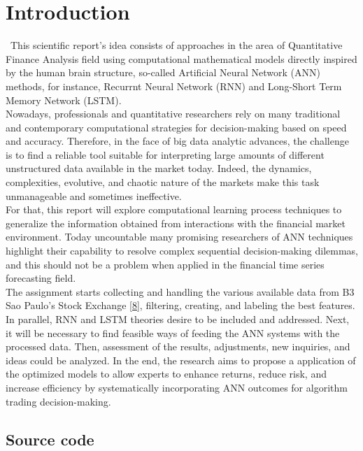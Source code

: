 \section{Introduction}
\label{chap:Introduction}

\quad \, This scientific report's idea consists of approaches in the area of Quantitative Finance Analysis field using computational mathematical models directly inspired by the human brain structure, so-called  Artificial Neural Network (ANN) methods, for instance, Recurrnt Neural Network (RNN) and Long-Short Term Memory Network (LSTM).\\

Nowadays, professionals and quantitative researchers rely on many traditional and contemporary computational strategies for decision-making based on speed and accuracy. Therefore, in the face of big data analytic advances, the challenge is to find a reliable tool suitable for interpreting large amounts of different unstructured data available in the market today. Indeed, the dynamics, complexities, evolutive, and chaotic nature of the markets make this task unmanageable and sometimes ineffective.\\

For that, this report will explore computational learning process techniques to generalize the information obtained from interactions with the financial market environment. Today uncountable many promising researchers of ANN techniques highlight their capability to resolve complex sequential decision-making dilemmas, and this should not be a problem when applied in the financial time series forecasting field.\\

The assignment starts collecting and handling the various available data from B3 Sao Paulo's Stock Exchange \hyperref[Bib:b3 quotes]{[8]}, filtering, creating, and labeling the best features.  In parallel, RNN and LSTM theories desire to be included and addressed. Next, it will be necessary to find feasible ways of feeding the ANN systems with the processed data. Then, assessment of the results, adjustments, new inquiries, and ideas could be analyzed. In the end, the research aims to propose a application of the optimized models to allow experts to enhance returns, reduce risk, and increase efficiency by systematically incorporating ANN outcomes for algorithm trading decision-making.

\subsection{Source code}
\label{chap:Source code}

